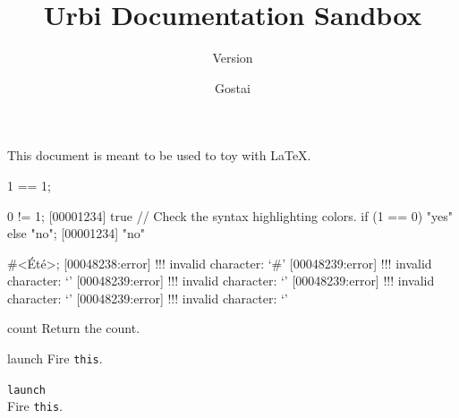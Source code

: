 \documentclass[openright,twoside,11pt]{book}
\title{Urbi Documentation Sandbox}
\subtitle{Version \VcsDescription}
\author{Gostai}
\begin{document}
This document is meant to be used to toy with \LaTeX{}.

\begin{urbiassert}[firstnumber=1]
1 == 1;
\end{urbiassert}

\begin{urbiscript}
0 != 1;
[00001234] true
// Check the syntax highlighting colors.
if (1 == 0) "yes" else "no";
[00001234] "no"
\end{urbiscript}

\begin{urbiunchecked}[escapeinside=<>]
#<Été>;
[00048238:error] !!! invalid character: `#'
[00048239:error] !!! invalid character: `'
[00048239:error] !!! invalid character: `'
[00048239:error] !!! invalid character: `'
[00048239:error] !!! invalid character: `'
\end{urbiunchecked}



\begin{urbiscriptapi}
\item[count]Return the count.
\item[launch]
  Fire \lstinline|this|.
\item \lstinline|launch|~\\
  Fire \lstinline|this|.

\end{urbiscriptapi}
\end{document}

